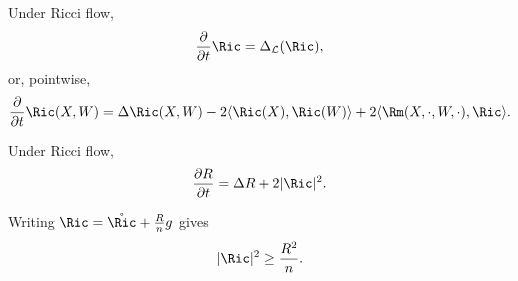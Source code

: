 \begin{proposition}
\label{topping:ricci-flow-ricci-evolution}

Under Ricci flow,
\[
\frac{\partial}{\partial t}\Ric=\Delta_{\mathcal L}(\Ric),
\]
or, pointwise,
\[
\frac{\partial}{\partial t}\Ric(X,W)
=\Delta\Ric(X,W)-2\langle\Ric(X),\Ric(W)\rangle
+2\langle\Rm(X,\cdot,W,\cdot),\Ric\rangle.
\]
\end{proposition}

\begin{proposition}
\label{topping:ricci-flow-scalar-evolution}

Under Ricci flow,
\[
\frac{\partial R}{\partial t}=\Delta R+2|\Ric|^2.
\]
\end{proposition}

\begin{remark}
\label{topping:ricci-flow-scalar-ineq}


Writing $\Ric=\mathring{\Ric}+\frac{R}{n}g$ gives
\[
|\Ric|^2\ge\frac{R^2}{n}.
\]
\end{remark}
